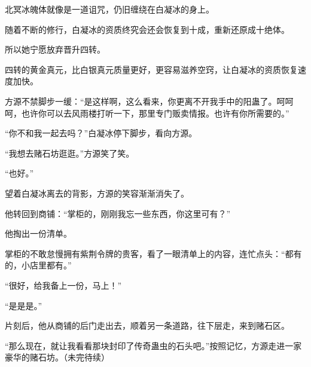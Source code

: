 \begin{this_body}
北冥冰魄体就像是一道诅咒，仍旧缠绕在白凝冰的身上。

随着不断的修行，白凝冰的资质终究会还会恢复到十成，重新还原成十绝体。

所以她宁愿放弃晋升四转。

四转的黄金真元，比白银真元质量更好，更容易滋养空窍，让白凝冰的资质恢复速度加快。

方源不禁脚步一缓：“是这样啊，这么看来，你更离不开我手中的阳蛊了。呵呵呵，也许你可以去风雨楼打听一下，那里专门贩卖情报。也许有你所需要的。”

“你不和我一起去吗？”白凝冰停下脚步，看向方源。

“我想去赌石坊逛逛。”方源笑了笑。

“也好。”

望着白凝冰离去的背影，方源的笑容渐渐消失了。

他转回到商铺：“掌柜的，刚刚我忘一些东西，你这里可有？”

他掏出一份清单。

掌柜的不敢怠慢拥有紫荆令牌的贵客，看了一眼清单上的内容，连忙点头：“都有的，小店里都有。”

“很好，给我备上一份，马上！”

“是是是。”

片刻后，他从商铺的后门走出去，顺着另一条道路，往下层走，来到赌石区。

“那么现在，就让我看看那块封印了传奇蛊虫的石头吧。”按照记忆，方源走进一家豪华的赌石坊。（未完待续）

\end{this_body}

